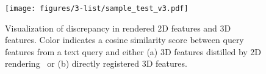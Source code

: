 \begin{figure}[t!]
    \centering
    \texttt{[image: figures/3-list/sample\_test\_v3.pdf]}
    \vspace{-6mm}
    \caption{
        Visualization of discrepancy in rendered 2D features and 3D features. Color indicates a cosine similarity score between query features from a text query and either (a) 3D features distilled by 2D rendering~\cite{langsplat}
        or (b) directly registered 3D features. 
    }
    \label{fig:motivation}
    \vspace{-4mm}
\end{figure}